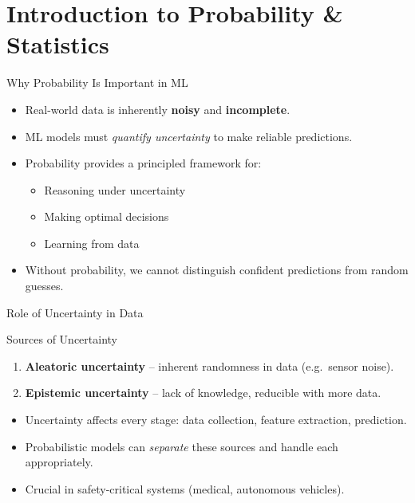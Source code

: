 \section{Introduction to Probability \& Statistics}

\begin{frame}{Why Probability Is Important in ML}
\begin{itemize}
    \item Real-world data is inherently \textbf{noisy} and \textbf{incomplete}.
    \item ML models must \emph{quantify uncertainty} to make reliable predictions.
    \item Probability provides a principled framework for:
    \begin{itemize}
        \item Reasoning under uncertainty
        \item Making optimal decisions
        \item Learning from data
    \end{itemize}
    \item Without probability, we cannot distinguish confident predictions from random guesses.
\end{itemize}
\end{frame}

\begin{frame}{Role of Uncertainty in Data}
\begin{block}{Sources of Uncertainty}
\begin{enumerate}
    \item \textbf{Aleatoric uncertainty} -- inherent randomness in data (e.g.\ sensor noise).
    \item \textbf{Epistemic uncertainty} -- lack of knowledge, reducible with more data.
\end{enumerate}
\end{block}
\vspace{6pt}
\begin{itemize}
    \item Uncertainty affects every stage: data collection, feature extraction, prediction.
    \item Probabilistic models can \emph{separate} these sources and handle each appropriately.
    \item Crucial in safety-critical systems (medical, autonomous vehicles).
\end{itemize}
\end{frame}


